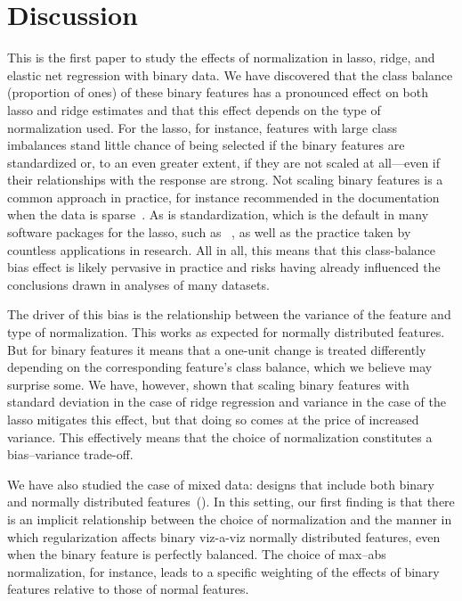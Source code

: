 \section{Discussion}


This is the first paper to study the effects of normalization in lasso, ridge, and elastic
net regression with binary data. We have discovered that the class balance (proportion of
ones) of these binary features has a pronounced effect on both lasso and ridge estimates
and that this effect depends on the type of normalization used. For the lasso, for
instance, features with large class imbalances stand little chance of being selected if the
binary features are standardized or, to an even greater extent, if they are not scaled at
all---even if their relationships with the response are strong. Not scaling binary features
is a common approach in practice, for instance recommended in the 
documentation when the data is sparse~\citep{scikit-learndevelopers2025}. As is
standardization, which is the default in many software packages for the lasso, such as
~\citep{friedman2010}, as well as the practice taken by countless applications
in research. All in all, this means that this class-balance bias effect is likely pervasive
in practice and risks having already influenced the conclusions drawn in analyses of many
datasets.

The driver of this bias is the relationship between the variance of the feature and type of
normalization. This works as expected for normally distributed features. But for binary
features it means that a one-unit change is treated differently depending on the
corresponding feature's class balance, which we believe may surprise some. We have,
however, shown that scaling binary features with standard deviation in the case of ridge
regression and variance in the case of the lasso mitigates this effect, but that doing so
comes at the price of increased variance. This effectively means that the choice of
normalization constitutes a bias--variance trade-off.

We have also studied the case of mixed data: designs that include both binary and normally
distributed features~(). In this setting, our first finding is that
there is an implicit relationship between the choice of normalization and the manner in
which regularization affects binary viz-a-viz normally distributed features, even when the
binary feature is perfectly balanced. The choice of max--abs normalization, for instance,
leads to a specific weighting of the effects of binary features relative to those of normal
features.

